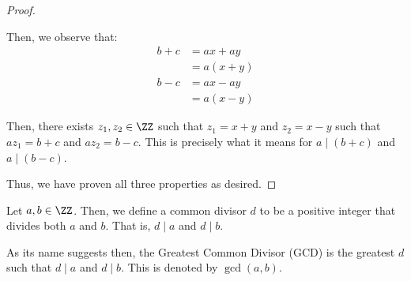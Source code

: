 \documentclass[openany]{book}
\begin{document}
\begin{proof}
\begin{innerproof}
		Then, we observe that:
		\begin{align*}
			b+c &= ax + ay \\
			&= a(x+y) \\
			b-c &= ax-ay \\
			&= a(x-y)
		\end{align*}
		
		Then, there exists $z_1, z_2 \in \ZZ$ such that $z_1 = x+y$ and $z_2 = x-y$ such that $az_1 = b+c$ and $az_2 = b-c$. This is precisely what it means for $a \mid (b+c)$ and $a \mid (b-c)$.
	\end{innerproof}
	
	Thus, we have proven all three properties as desired.
\end{proof}

\begin{defn}
	Let $a, b \in \ZZ$. Then, we define a common divisor $d$ to be a positive integer that divides both $a$ and $b$. That is, $d \mid a$ and $d \mid b$.
	
	As its name suggests then, the Greatest Common Divisor (GCD) is the greatest $d$ such that $d \mid a$ and $d \mid b$. This is denoted by $\gcd(a,b)$.
\end{defn}
\end{document}
